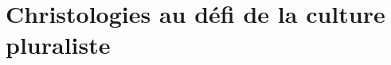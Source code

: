 \documentclass[oneside,10pt]{book}
\begin{document}




%
 
\part{Christologies au défi de la culture pluraliste}




%


%
\end{document}
